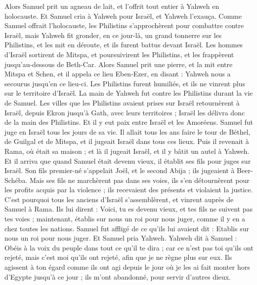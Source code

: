 \begin{multicols}{2}
Alors Samuel prit un agneau de lait, et l'offrit tout entier à Yahweh en holocauste. Et Samuel cria à Yahweh pour Israël, et Yahweh l'exauça.
Comme Samuel offrait l'holocauste, les Philistins s'approchèrent pour combattre contre Israël, mais Yahweh fit gronder, en ce jour-là, un grand tonnerre sur les Philistins, et les mit en déroute, et ils furent battus devant Israël.
Les hommes d'Israël sortirent de Mitspa, et poursuivirent les Philistins, et les frappèrent jusqu'au-dessous de Beth-Car.
Alors Samuel prit une pierre, et la mit entre Mitspa et Schen, et il appela ce lieu Eben-Ezer, en disant : Yahweh nous a secourus jusqu'en ce lieu-ci.
Les Philistins furent humiliés, et ils ne vinrent plus sur le territoire d'Israël. La main de Yahweh fut contre les Philistins durant la vie de Samuel.
Les villes que les Philistins avaient prises sur Israël retournèrent à Israël, depuis Ekron jusqu'à Gath, avec leurs territoires ; Israël les délivra donc de la main des Philistins. Et il y eut paix entre Israël et les Amoréens.
Samuel fut juge en Israël tous les jours de sa vie.
Il allait tous les ans faire le tour de Béthel, de Guilgal et de Mitspa, et il jugeait Israël dans tous ces lieux.
Puis il revenait à Rama, où était sa maison ; et là il jugeait Israël, et il y bâtit un autel à Yahweh.
\VerseOne{}Et il arriva que quand Samuel était devenu vieux, il établit ses fils pour juges sur Israël.
Son fils premier-né s'appelait Joël, et le second Abija ; ils jugeaient à Beer-Schéba.
Mais ses fils ne marchèrent pas dans ses voies, ils s'en détournèrent pour les profits acquis par la violence ; ils recevaient des présents et violaient la justice.
C'est pourquoi tous les anciens d'Israël s'assemblèrent, et vinrent auprès de Samuel à Rama.
Ils lui dirent : Voici, tu es devenu vieux, et tes fils ne suivent pas tes voies ; maintenant, établis sur nous un roi pour nous juger, comme il y en a chez toutes les nations.
Samuel fut affligé de ce qu'ils lui avaient dit : Etablis sur nous un roi pour nous juger. Et Samuel pria Yahweh.
Yahweh dit à Samuel : Obéis à la voix du peuple dans tout ce qu'il te dira ; car ce n'est pas toi qu'ils ont rejeté, mais c'est moi qu'ils ont rejeté, afin que je ne règne plus sur eux.
Ils agissent à ton égard comme ils ont agi depuis le jour où je les ai fait monter hors d'Egypte jusqu'à ce jour ; ils m'ont abandonné, pour servir d'autres dieux.

\end{multicols}
